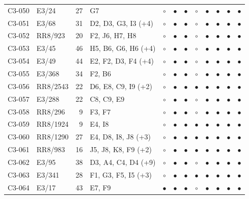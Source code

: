 {\begin{longtable}{llrp{3.9cm}cccccccc}
    C3-050 & E3/24 & 27 & G7 & $\circ$ & $\bullet$ & $\bullet$ & $\circ$ & $\bullet$ & $\bullet$ & $\bullet$ & $\bullet$ \\
    C3-051 & E3/68 & 31 & D2, D3, G3, I3 (+4) & $\circ$ & $\bullet$ & $\bullet$ & $\circ$ & $\bullet$ & $\bullet$ & $\bullet$ & $\bullet$ \\
    C3-052 & RR8/923 & 20 & F2, J6, H7, H8 & $\circ$ & $\bullet$ & $\bullet$ & $\circ$ & $\bullet$ & $\bullet$ & $\bullet$ & $\bullet$ \\
    C3-053 & E3/45 & 46 & H5, B6, G6, H6 (+4) & $\circ$ & $\bullet$ & $\bullet$ & $\circ$ & $\bullet$ & $\bullet$ & $\bullet$ & $\bullet$ \\
    C3-054 & E3/49 & 44 & E2, F2, D3, F4 (+4) & $\circ$ & $\bullet$ & $\bullet$ & $\circ$ & $\bullet$ & $\bullet$ & $\bullet$ & $\bullet$ \\
    C3-055 & E3/368 & 34 & F2, B6 & $\circ$ & $\bullet$ & $\bullet$ & $\circ$ & $\bullet$ & $\bullet$ & $\bullet$ & $\bullet$ \\
    C3-056 & RR8/2543 & 22 & D6, E8, C9, I9 (+2) & $\circ$ & $\bullet$ & $\bullet$ & $\bullet$ & $\bullet$ & $\bullet$ & $\bullet$ & $\bullet$ \\
    C3-057 & E3/288 & 22 & C8, C9, E9 & $\circ$ & $\bullet$ & $\bullet$ & $\circ$ & $\bullet$ & $\bullet$ & $\bullet$ & $\bullet$ \\
    C3-058 & RR8/296 & 9 & F3, F7 & $\circ$ & $\bullet$ & $\bullet$ & $\circ$ & $\bullet$ & $\bullet$ & $\bullet$ & $\bullet$ \\
    C3-059 & RR8/1924 & 9 & E4, I8 & $\circ$ & $\bullet$ & $\bullet$ & $\bullet$ & $\bullet$ & $\bullet$ & $\bullet$ & $\bullet$ \\
    C3-060 & RR8/1290 & 27 & E4, D8, I8, J8 (+3) & $\circ$ & $\bullet$ & $\bullet$ & $\bullet$ & $\bullet$ & $\bullet$ & $\bullet$ & $\bullet$ \\
    C3-061 & RR8/983 & 16 & J5, J8, K8, F9 (+2) & $\circ$ & $\bullet$ & $\bullet$ & $\bullet$ & $\bullet$ & $\bullet$ & $\bullet$ & $\bullet$ \\
    C3-062 & E3/95 & 38 & D3, A4, C4, D4 (+9) & $\circ$ & $\bullet$ & $\bullet$ & $\circ$ & $\bullet$ & $\bullet$ & $\bullet$ & $\bullet$ \\
    C3-063 & E3/341 & 28 & F1, G3, F5, I5 (+3) & $\circ$ & $\bullet$ & $\bullet$ & $\bullet$ & $\bullet$ & $\bullet$ & $\bullet$ & $\bullet$ \\
    C3-064 & E3/17 & 43 & E7, F9 & $\bullet$ & $\bullet$ & $\bullet$ & $\circ$ & $\bullet$ & $\bullet$ & $\bullet$ & $\bullet$ \\

\end{longtable}}
